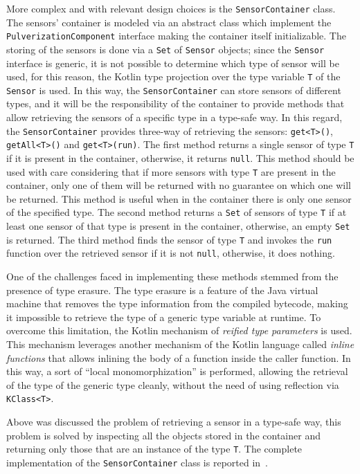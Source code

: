 More complex and with relevant design choices is the \texttt{SensorContainer} class. The sensors' container is modeled via an abstract class
which implement the \texttt{PulverizationComponent} interface making the container itself initializable.
The storing of the sensors is done via a \texttt{Set} of \texttt{Sensor} objects; since the \texttt{Sensor} interface is generic, it is not possible
to determine which type of sensor will be used, for this reason, the Kotlin type projection over the type variable \texttt{T} of the \texttt{Sensor}
is used. In this way, the \texttt{SensorContainer} can store sensors of different types, and it will be the responsibility of the container to provide
methods that allow retrieving the sensors of a specific type in a type-safe way.
In this regard, the \texttt{SensorContainer} provides three-way of retrieving the sensors: \texttt{get<T>()}, \texttt{getAll<T>()} and
\texttt{get<T>(run)}.
The first method returns a single sensor of type \texttt{T} if it is present in the container, otherwise, it returns \texttt{null}.
This method should be used with care considering that if more sensors with type \texttt{T} are present in the container, only one of them will be
returned with no guarantee on which one will be returned. This method is useful when in the container there is only one sensor of the specified
type.
The second method returns a \texttt{Set} of sensors of type \texttt{T} if at least one sensor of that type is present in the container, otherwise,
an empty \texttt{Set} is returned.
The third method finds the sensor of type \texttt{T} and invokes the \texttt{run} function over the retrieved sensor if it is not \texttt{null},
otherwise, it does nothing.

One of the challenges faced in implementing these methods stemmed from the presence of type erasure.
The type erasure is a feature of the Java virtual machine that removes the type information from the compiled bytecode, making it impossible to
retrieve the type of a generic type variable at runtime. To overcome this limitation, the Kotlin mechanism of \emph{reified type parameters} is used.
This mechanism leverages another mechanism of the Kotlin language called \emph{inline functions} that allows inlining the body of a function
inside the caller function. In this way, a sort of ``local monomorphization'' is performed, allowing the retrieval of the type of the generic type
cleanly, without the need of using reflection via \texttt{KClass<T>}.

Above was discussed the problem of retrieving a sensor in a type-safe way, this problem is solved by inspecting all the objects stored in the
container and returning only those that are an instance of the type \texttt{T}.
The complete implementation of the \texttt{SensorContainer} class is reported in~.

